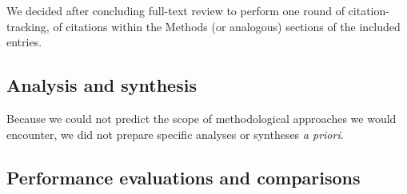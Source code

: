 \documentclass[preprint, 3p,
authoryear]{elsarticle} %
\begin{document}
We decided after concluding full-text review to perform one round of
citation-tracking, of citations within the Methods (or analogous)
sections of the included entries.

\hypertarget{analysis-and-synthesis}{%
\subsection{Analysis and synthesis}\label{analysis-and-synthesis}}

Because we could not predict the scope of methodological approaches we
would encounter, we did not prepare specific analyses or syntheses
\emph{a priori}.

\hypertarget{performance-evaluations-and-comparisons}{%
\subsection{Performance evaluations and
comparisons}\label{performance-evaluations-and-comparisons}}
\end{document}
